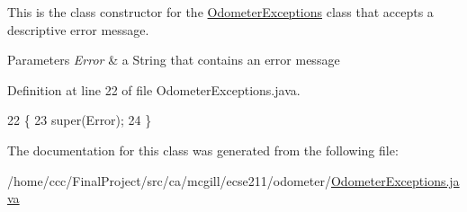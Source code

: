 This is the class constructor for the \hyperlink{classca_1_1mcgill_1_1ecse211_1_1odometer_1_1_odometer_exceptions}{Odometer\+Exceptions} class that accepts a descriptive error message.


\begin{DoxyParams}{Parameters}
{\em Error} & a String that contains an error message \\
\hline
\end{DoxyParams}


Definition at line 22 of file Odometer\+Exceptions.\+java.


\begin{DoxyCode}
22                                           \{
23     super(Error);
24   \}
\end{DoxyCode}


The documentation for this class was generated from the following file\+:\begin{DoxyCompactItemize}
\item 
/home/ccc/\+Final\+Project/src/ca/mcgill/ecse211/odometer/\hyperlink{_odometer_exceptions_8java}{Odometer\+Exceptions.\+java}\end{DoxyCompactItemize}
